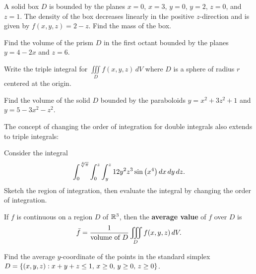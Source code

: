 \documentclass[mathNotesPreamble]{subfiles}
\begin{document}
  \begin{ex*}
    A solid box $D$ is bounded by the planes $x=0$, $x=3$, $y=0$, $y=2$, $z=0$, and $z=1$. The density of the box decreases linearly in the positive $z$-direction and is given by $f(x,y,z)=2-z$. Find the mass of the box.
  \end{ex*}

  \begin{ex*}
    Find the volume of the prism $D$ in the first octant bounded by the planes $y=4-2x$ and $z=6$.
  \end{ex*}
  \pagebreak

  \begin{ex*}
    Write the triple integral for $\iiint\limits_D f(x,y,z)\,dV$ where $D$ is a sphere of radius $r$ centered at the origin.
  \end{ex*}
  \vspace*{5\baselineskip}
  \begin{ex*}
    Find the volume of the solid $D$ bounded by the paraboloids $y=x^2+3z^2+1$ and $y=5-3x^2-z^2$.
  \end{ex*}
  \pagebreak

  \noindent
  The concept of changing the order of integration for double integrals also extends to triple integrals:
  \begin{ex*}
    Consider the integral
      \[\int_0^{\sqrt[4]{\pi}} \int_0^z \int_y^z 12y^2z^3\sin{\left(x^4\right)}\,dx\,dy\,dz.\]
    Sketch the region of integration, then evaluate the integral by changing the order of integration.
  \end{ex*}
  \pagebreak

  \begin{defn*}
    If $f$ is continuous on a region $D$ of $\mathbb{R}^3$, then the \textbf{average value} of $f$ over $D$ is
      \[\bar{f}=\frac{1}{\textnormal{volume of }D}\iiint\limits_D f(x,y,z)\,dV.\]
  \end{defn*}

  \begin{ex*}
    Find the average $y$-coordinate of the points in the standard simplex \newline$D={\left\{(x,y,z): x+y+z\leq 1,\, x\geq 0,\, y\geq 0,\, z\geq 0\right\}}$.
  \end{ex*}

  \pagebreak
  
\end{document}
